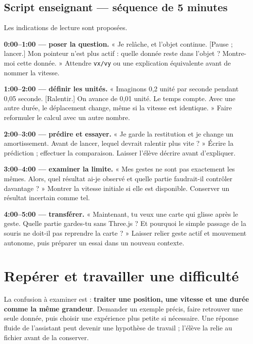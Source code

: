 \documentclass[
  canadien,
  11pt,
  a4paper,
]{report}
\begin{document}
\subsection{Script enseignant --- séquence de 5
minutes}\label{script-enseignant-suxe9quence-de-5-minutes-3}

Les indications de lecture sont proposées.

\textbf{0:00--1:00 --- poser la question.} « Je relâche, et l'objet
continue. {[}Pause ; lancer.{]} Mon pointeur n'est plus actif : quelle
donnée reste dans l'objet ? Montre-moi cette donnée. » Attendre
\texttt{vx/\allowbreak{}vy} ou une explication équivalente avant de nommer la
vitesse.

\textbf{1:00--2:00 --- définir les unités.} « Imaginons 0,2 unité par
seconde pendant 0,05 seconde. {[}Ralentir.{]} On avance de 0,01 unité.
Le temps compte. Avec une autre durée, le déplacement change, même si la
vitesse est identique. » Faire reformuler le calcul avec un autre
nombre.

\textbf{2:00--3:00 --- prédire et essayer.} « Je garde la restitution et
je change un amortissement. Avant de lancer, lequel devrait ralentir
plus vite ? » Écrire la prédiction ; effectuer la comparaison. Laisser
l'élève décrire avant d'expliquer.

\textbf{3:00--4:00 --- examiner la limite.} « Mes gestes ne sont pas
exactement les mêmes. Alors, quel résultat ai-je observé et quelle
partie faudrait-il contrôler davantage ? » Montrer la vitesse initiale
si elle est disponible. Conserver un résultat incertain comme tel.

\textbf{4:00--5:00 --- transférer.} « Maintenant, tu veux une carte qui
glisse après le geste. Quelle partie gardes-tu sans Three.js ? Et
pourquoi le simple passage de la souris ne doit-il pas reprendre la
carte ? » Laisser relier geste actif et mouvement autonome, puis
préparer un essai dans un nouveau contexte.

\section{Repérer et travailler une
difficulté}\label{repuxe9rer-et-travailler-une-difficultuxe9-3}

La confusion à examiner est : \textbf{traiter une position, une vitesse
et une durée comme la même grandeur}. Demander un exemple précis, faire
retrouver une seule donnée, puis choisir une expérience plus petite si
nécessaire. Une réponse fluide de l'assistant peut devenir une hypothèse
de travail ; l'élève la relie au fichier avant de la conserver.
\end{document}

